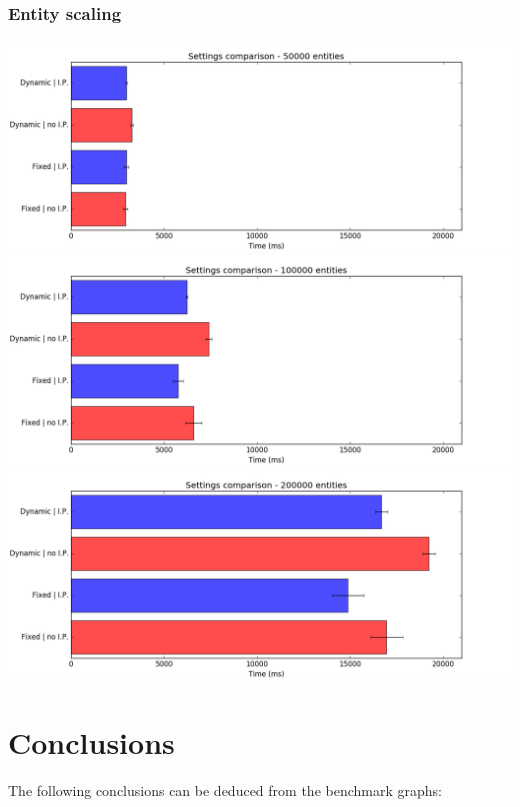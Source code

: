 \documentclass[oneside, 12pt, a4paper, openany]{book}
\begin{document}
\subsubsection{Entity scaling}\label{entity-scaling-1}

\includegraphics{source/figures/bench2/entity_50k.png}
\includegraphics{source/figures/bench2/entity_100k.png}
\includegraphics{source/figures/bench2/entity_200k.png}

\section{Conclusions}\label{conclusions}

The following conclusions can be deduced from the benchmark graphs:
\end{document}
